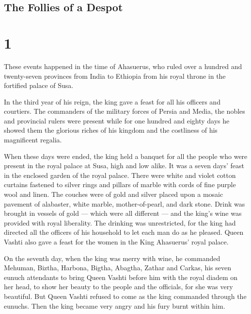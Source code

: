 \hypertarget{the-follies-of-a-despot}{%
\subsection{The Follies of a Despot}\label{the-follies-of-a-despot}}

\hypertarget{section}{%
\section{1}\label{section}}

 These events happened in the time of Ahasuerus, who ruled
over a hundred and twenty-seven provinces from India to Ethiopia
 from his royal throne in the fortified palace of Susa.

 In the third year of his reign, the king gave a feast for
all his officers and courtiers. The commanders of the military forces of
Persia and Media, the nobles and provincial rulers were present
 while for one hundred and eighty days he showed them the
glorious riches of his kingdom and the costliness of his magnificent
regalia.

 When these days were ended, the king held a banquet for all
the people who were present in the royal palace at Susa, high and low
alike. It was a seven days' feast in the enclosed garden of the royal
palace.  There were white and violet cotton curtains
fastened to silver rings and pillars of marble with cords of fine purple
wool and linen. The couches were of gold and silver placed upon a mosaic
pavement of alabaster, white marble, mother-of-pearl, and dark stone.
 Drink was brought in vessels of gold --- which were all
different --- and the king's wine was provided with royal liberality.
 The drinking was unrestricted, for the king had directed
all the officers of his household to let each man do as he pleased.
 Queen Vashti also gave a feast for the women in the King
Ahasuerus' royal palace.

 On the seventh day, when the king was merry with wine, he
commanded Mehuman, Biztha, Harbona, Bigtha, Abagtha, Zathar and Carkas,
his seven eunuch attendants  to bring Queen Vashti before
him with the royal diadem on her head, to show her beauty to the people
and the officials, for she was very beautiful.  But Queen
Vashti refused to come as the king commanded through the eunuchs. Then
the king became very angry and his fury burnt within him.


